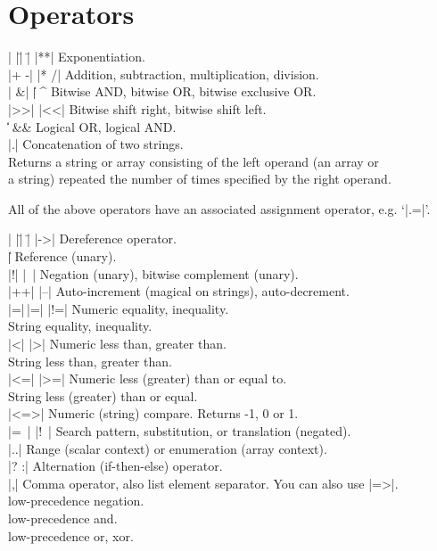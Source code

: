 \documentclass{refbase}
\begin{document}
\section{Operators} 

\begin{tabbing}
|    |\=|    |\= \kill
|**| \> \> Exponentiation. \\
|+ -| \> |* /| \> Addition, subtraction, multiplication, division. \\
|%
\&| |\| \> \^ \> Bitwise AND, bitwise OR, bitwise exclusive OR. \\
|>>| \> |<<| \> Bitwise shift right, bitwise shift left. \\
\|\| \> \&\&   \> Logical OR, logical AND. \\
|.| \> \> Concatenation of two strings. \\
 \> \> Returns a string or array consisting of the left operand
(an array or \\
\> \> a string) repeated the number of times specified by the right operand.
\end{tabbing}

All of the above operators have an associated assignment operator, e.g. `|.=|'.

\begin{tabbing}
|    |\=|    |\= \kill
|->| \> \> Dereference operator. \\
|\| \> \> Reference (unary). \\
|!| \> |~| \> Negation (unary), bitwise complement (unary). \\
|++| \> |--| \> Auto-increment (magical on strings), auto-decrement. \\
|=|\,|=| \> |!=| \> Numeric equality, inequality. \\
 \>  \> String equality, inequality. \\
|<|  \>  |>|  \> Numeric less than, greater than. \\
 \>  \> String less than, greater than. \\
|<=| \> |>=| \> Numeric less (greater) than or equal to. \\
 \>  \> String less (greater) than or equal. \\
|<=>| \>  \> Numeric (string) compare. Returns -1, 0 or 1. \\
|=~| \> |!~| \> Search pattern, substitution, or translation (negated). \\
|..| \> \> Range (scalar context) or enumeration (array context). \\
|? :|\>      \> Alternation (if-then-else) operator. \\
|,| \> \> Comma operator, also list element separator.
You can also use |=>|.\\
 \> \> low-precedence negation. \\
 \> \> low-precedence and. \\
 \>  \> low-precedence or, xor.
\end{tabbing}
\end{document}

